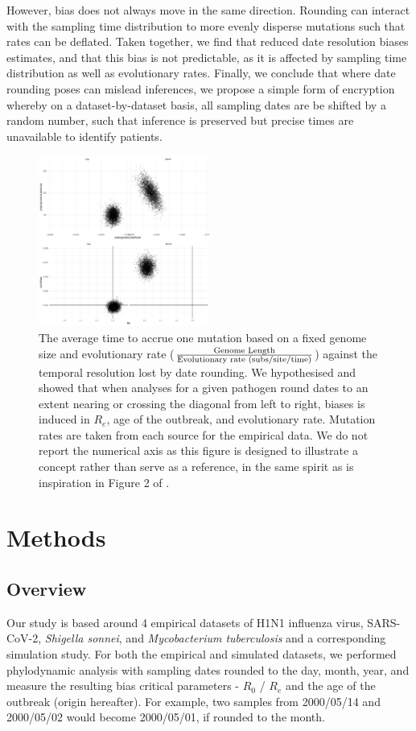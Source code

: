 \documentclass{article}
\begin{document}
\begin{spacing}{1.5}
 However, bias does not always move in the same direction. Rounding can interact with the sampling time distribution to more evenly disperse mutations such that rates can be deflated. Taken together, we find that reduced date resolution biases estimates, and that this bias is not predictable, as it is affected by sampling time distribution as well as evolutionary rates. Finally, we conclude that where date rounding poses can mislead inferences, we propose a simple form of encryption whereby on a dataset-by-dataset basis, all sampling dates are be shifted by a random number, such that inference is preserved but precise times are unavailable to identify patients.

\begin{figure}[!ht]
    \centering
    \includegraphics[width = 0.5\textwidth]{plane.pdf}
    \caption{The average time to accrue one mutation based on a fixed genome size and evolutionary rate ($\frac{\textnormal{Genome Length}}{\textnormal{Evolutionary rate (subs/site/time)}}$) against the temporal resolution lost by date rounding. We hypothesised and showed that when analyses for a given pathogen round dates to an extent nearing or crossing the diagonal from left to right, biases is induced in $R_e$, age of the outbreak, and evolutionary rate. Mutation rates are taken from each source for the empirical data. We do not report the numerical axis as this figure is designed to illustrate a concept rather than serve as a reference, in the same spirit as is inspiration in Figure 2 of \citet{biek_measurably_2015}.}
    \label{fig:plane}
\end{figure}


\section*{Methods}
\subsection*{Overview}
Our study is based around 4 empirical datasets of H1N1 influenza virus, SARS-CoV-2, \textit{Shigella sonnei}, and \textit{Mycobacterium tuberculosis} and a corresponding simulation study. For both the empirical and simulated datasets, we performed phylodynamic analysis with sampling dates rounded to the day, month, year, and measure the resulting bias critical parameters - $R_0$ / $R_e$ and the age of the outbreak (origin hereafter). For example, two samples from 2000/05/14 and 2000/05/02 would become 2000/05/01, if rounded to the month. 


\end{spacing}
\end{document}
